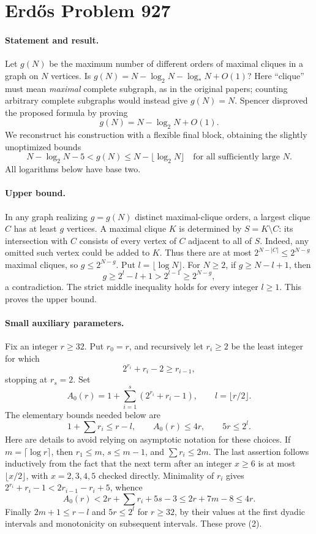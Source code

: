 \section*{Erd\H{o}s Problem 927}

\paragraph{Statement and result.}
Let \(g(N)\) be the maximum number of different orders of maximal cliques in a graph on \(N\) vertices. Is
\(g(N)=N-\log_2N-\log_*N+O(1)\)? Here ``clique'' must mean \emph{maximal} complete subgraph, as in the original papers; counting arbitrary complete subgraphs would instead give \(g(N)=N\). Spencer disproved the proposed formula by proving
\[
 g(N)=N-\log_2N+O(1).
\]
We reconstruct his construction with a flexible final block, obtaining the slightly unoptimized bounds
\[
 N-\log_2N-5<g(N)\leq N-\lfloor\log_2N\rfloor
 \quad\text{for all sufficiently large }N. \tag{1}
\]
All logarithms below have base two.

\paragraph{Upper bound.}
In any graph realizing \(g=g(N)\) distinct maximal-clique orders, a largest clique \(C\) has at least \(g\) vertices. A maximal clique \(K\) is determined by \(S=K\setminus C\): its intersection with \(C\) consists of every vertex of \(C\) adjacent to all of \(S\). Indeed, any omitted such vertex could be added to \(K\). Thus there are at most \(2^{N-|C|}\leq2^{N-g}\) maximal cliques, so
\(g\leq2^{N-g}\). Put \(l=\lfloor\log N\rfloor\). For \(N\geq2\), if \(g\geq N-l+1\), then
\[
 g\geq2^l-l+1>2^{l-1}\geq2^{N-g},
\]
a contradiction. The strict middle inequality holds for every integer \(l\geq1\). This proves the upper bound.

\paragraph{Small auxiliary parameters.}
Fix an integer \(r\geq32\). Put \(r_0=r\), and recursively let \(r_i\geq2\) be the least integer for which
\[
 2^{r_i}+r_i-2\geq r_{i-1},
\]
stopping at \(r_s=2\). Set
\[
 A_0(r)=1+\sum_{i=1}^s(2^{r_i}+r_i-1),\qquad
 l=\lfloor r/2\rfloor.
\]
The elementary bounds needed below are
\[
 1+\sum r_i\leq r-l,\qquad A_0(r)\leq4r,
 \qquad 5r\leq2^l. \tag{2}
\]
Here are details to avoid relying on asymptotic notation for these choices. If \(m=\lceil\log r\rceil\), then \(r_1\leq m\), \(s\leq m-1\), and \(\sum r_i\leq2m\). The last assertion follows inductively from the fact that the next term after an integer \(x\geq6\) is at most \(\lfloor x/2\rfloor\), with \(x=2,3,4,5\) checked directly. Minimality of \(r_i\) gives
\(2^{r_i}+r_i-1<2r_{i-1}-r_i+5\), whence
\[
 A_0(r)<2r+\sum r_i+5s-3\leq2r+7m-8\leq4r.
\]
Finally \(2m+1\leq r-l\) and \(5r\leq2^l\) for \(r\geq32\), by their values at the first dyadic intervals and monotonicity on subsequent intervals. These prove (2).

